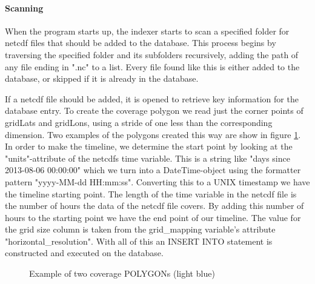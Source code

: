 \documentclass[11pt,a4paper,titlepage,oneside]{report}
\begin{document}
\paragraph{Scanning}
When the program starts up, the indexer starts to scan a specified folder for \gls{netcdf} files that should be added to the database. This process begins by traversing the specified folder and its subfolders recursively, adding the path of any file ending in ".nc" to a list. Every file found like this is either added to the database, or skipped if it is already in the database. 

If a \gls{netcdf} file should be added, it is opened to retrieve key information for the database entry. To create the coverage polygon we read just the corner points of gridLats and gridLons, using a stride of one less than the corresponding dimension. Two examples of the polygons created this way are show in figure \ref{fig:IndexerDatasets}. In order to make the timeline, we determine the start point by looking at the "units"-attribute of the \gls{netcdf}s time variable. This is a string like "days since 2013-08-06 00:00:00" which we turn into a DateTime-object using the formatter pattern "yyyy-MM-dd HH:mm:ss". Converting this to a UNIX timestamp we have the timeline starting point. The length of the time variable in the \gls{netcdf} file is the number of hours the data of the \gls{netcdf} file covers. By adding this number of hours to the starting point we have the end point of our timeline. The value for the grid size column is taken from the grid\_mapping variable’s attribute "horizontal\_resolution". With all of this an INSERT INTO statement is constructed and executed on the database.

\begin{figure}[!htb]
\begin{center}
\caption{Example of two coverage POLYGONs (light blue)}
\label{fig:IndexerDatasets}
\end{center}
\end{figure}
\end{document}

